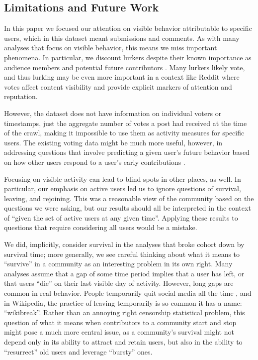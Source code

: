 \subsection{Limitations and Future Work}

In this paper we focused our attention on visible behavior attributable to specific users, which in this dataset meant submissions and comments.  As with many analyses that focus on visible behavior, this means we miss important phenomena.  In particular, we discount lurkers despite their known importance as audience members \cite{Nonnecke2003} and potential future contributors \cite{Ridings2006}.  Many lurkers likely vote, and thus lurking may be even more important in a context like Reddit where votes affect content visibility and provide explicit markers of attention and reputation.  

However, the dataset does not have information on individual voters or timestamps, just the aggregate number of votes a post had received at the time of the crawl, making it impossible to use them as activity measures for specific users.  The existing voting data might be much more useful, however, in addressing questions that involve predicting a given user's future behavior based on how other users respond to a user's early contributions \cite{Joyce2006,Sarkar2012}.

Focusing on visible activity can lead to blind spots in other places, as well.  In particular, our emphasis on active users led us to ignore questions of survival, leaving, and rejoining.  This was a reasonable view of the community based on the questions we were asking, but our results should all be interpreted in the context of ``given the set of active users at any given time''.  Applying these results to questions that require considering all users would be a mistake.  

We did, implicitly, consider survival in the analyses that broke cohort down by survival time; more generally, we see careful thinking about what it means to ``survive'' in a community as an interesting problem in its own right.  Many analyses assume that a gap of some time period implies that a user has left, or that users ``die'' on their last visible day of activity.  However, long gaps are common in real behavior.  People temporarily quit social media all the time \cite{Baumer2013}, and in Wikipedia, the practice of leaving temporarily is so common it has a name: ``wikibreak''.    Rather than an annoying right censorship statistical problem, this question of what it means when contributors to a community start and stop might pose a much more central issue, as a community's survival might not depend only in its ability to attract and retain users, but also in the ability to ``resurrect'' old users and leverage ``bursty'' ones.

